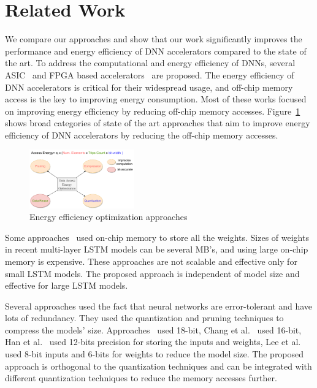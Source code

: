 \documentclass[a4paper,10pt]{article}
\begin{document}
\section{Related Work}
We compare our approaches and show that our work significantly improves the performance and energy efficiency of DNN accelerators compared to the state of the art. To address the computational and energy efficiency of DNNs, several ASIC~\cite{conti2018chipmunk,wang2017accelerating,azari2020elsa} and FPGA based accelerators~\cite{chang2015recurrent,ferreira2016fpga,lee2016fpga,guan2017fpga,han2017ese} are proposed. The energy efficiency of DNN accelerators is critical for their widespread usage, and off-chip memory access is the key to improving energy consumption. Most of these works focused on improving energy efficiency by reducing off-chip memory accesses. Figure~\ref{fig:dataEnergyRelatedWork} shows broad categories of state of the art approaches that aim to improve energy efficiency of DNN accelerators by reducing the off-chip memory accesses.
\begin{figure}[!htb]
	\centering
	\includegraphics[width=0.4\textwidth]{./images/dataEnergyOptRelatedWork}
	\caption{Energy efficiency optimization approaches}
	\label{fig:dataEnergyRelatedWork}
\end{figure}

Some approaches~\cite{lee2016fpga, rybalkin2018finn, ferreira2016fpga} used on-chip memory to store all the weights. Sizes of weights in recent multi-layer LSTM models can be several MB's, and using large on-chip memory is expensive. These approaches are not scalable and effective only for small LSTM models. The proposed approach is independent of model size and effective for large LSTM models.

Several approaches used the fact that neural networks are error-tolerant and have lots of redundancy. They used the quantization and pruning techniques to compress the models' size. Approaches~\cite{ferreira2016fpga,wang2018c} used 18-bit, Chang et al.~\cite{chang2015recurrent} used 16-bit, Han et al.~\cite{han2017ese} used 12-bits precision for storing the inputs and weights, Lee et al.~\cite{lee2016fpga} used 8-bit inputs and 6-bits for weights to reduce the model size. The proposed approach is orthogonal to the quantization techniques and can be integrated with different quantization techniques to reduce the memory accesses further. 
\end{document}
